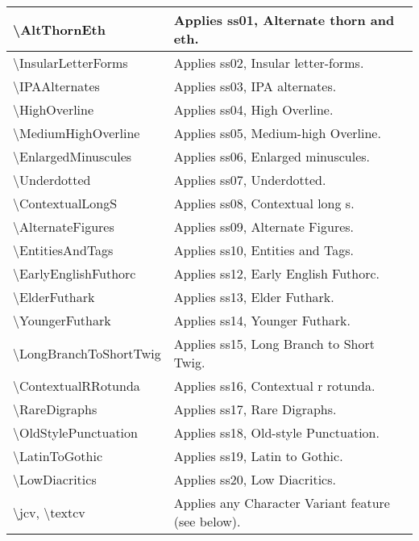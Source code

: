 \documentclass{article}
\begin{document}
\begin{center}
\tablehead{\hline}
\tabletail{\hline}
\begin{supertabular}{| l | p{2.75in} |}
\textbackslash AltThornEth & Applies ss01, Alternate thorn and eth.\\\hline
\textbackslash InsularLetterForms & Applies ss02, Insular letter-forms.\\\hline
\textbackslash IPAAlternates & Applies ss03, IPA alternates.\\\hline
\textbackslash HighOverline & Applies ss04, High Overline.\\\hline
\textbackslash MediumHighOverline & Applies ss05, Medium-high Overline.\\\hline
\textbackslash EnlargedMinuscules & Applies ss06, Enlarged minuscules.\\\hline
\textbackslash Underdotted & Applies ss07, Underdotted.\\\hline
\textbackslash ContextualLongS & Applies ss08, Contextual long s.\\\hline
\textbackslash AlternateFigures & Applies ss09, Alternate Figures.\\\hline
\textbackslash EntitiesAndTags & Applies ss10, Entities and Tags.\\\hline
\textbackslash EarlyEnglishFuthorc & Applies ss12, Early English Futhorc.\\\hline
\textbackslash ElderFuthark & Applies ss13, Elder Futhark.\\\hline
\textbackslash YoungerFuthark & Applies ss14, Younger Futhark.\\\hline
\textbackslash LongBranchToShortTwig & Applies ss15, Long Branch to Short Twig.\\\hline
\textbackslash ContextualRRotunda & Applies ss16, Contextual r rotunda.\\\hline
\textbackslash RareDigraphs & Applies ss17, Rare Digraphs.\\\hline
\textbackslash OldStylePunctuation & Applies ss18, Old-style Punctuation.\\\hline
\textbackslash LatinToGothic & Applies ss19, Latin to Gothic.\\\hline
\textbackslash LowDiacritics & Applies ss20, Low Diacritics.\\\hline
\textbackslash jcv, \textbackslash textcv & Applies any Character Variant feature (see below).\\
\end{supertabular}
\end{center}
\end{document}

